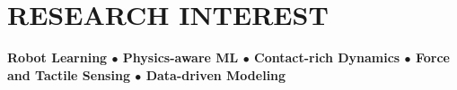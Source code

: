 \documentclass[a4paper,10pt]{extarticle}
\begin{document}

\section*{RESEARCH INTEREST}
 {\small\textbf{Robot Learning $\bullet$ Physics-aware ML $\bullet$ Contact-rich Dynamics $\bullet$ Force and Tactile Sensing $\bullet$ Data-driven Modeling}}



\end{document}
